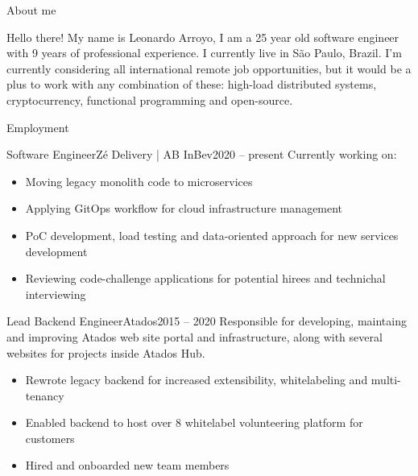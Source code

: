 \documentclass[]{Arroyo}
\begin{document}
	\makeheader

	\begin{cvsection}{About me}
		\begin{cvsubsection}{}{}{}	
            Hello there! My name is Leonardo Arroyo, I am a 25 year old software engineer with 9 years of professional experience. I currently live in São Paulo, Brazil.
			I'm currently considering all international remote job opportunities, but it would be a plus to work with any combination of these: high-load distributed systems, cryptocurrency, functional programming and open-source.
		\end{cvsubsection}
      \end{cvsection}
	
	\begin{cvsection}{Employment}
		\begin{cvsubsection}{Software Engineer}{Zé Delivery | AB InBev}{2020 -- present}
            Currently working on:
			\begin{itemize}
                \item Moving legacy monolith code to microservices
                \item Applying GitOps workflow for cloud infrastructure management
                \item PoC development, load testing and data-oriented approach for new services development
                \item Reviewing code-challenge applications for potential hirees and technichal interviewing
			\end{itemize}
		\end{cvsubsection}
		
		\begin{cvsubsection}{Lead Backend Engineer}{Atados}{2015 -- 2020}	
            Responsible for developing, maintaing and improving Atados web site portal and infrastructure, along with several websites for projects inside Atados Hub.
			\begin{itemize}
                \item Rewrote legacy backend for increased extensibility, whitelabeling and multi-tenancy
                \item Enabled backend to host over 8 whitelabel volunteering platform for customers
                \item Hired and onboarded new team members
			\end{itemize}
		\end{cvsubsection}
		

\end{cvsection}
\end{document}
